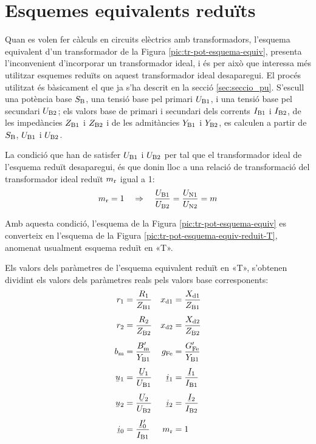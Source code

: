 \section{Esquemes equivalents reduïts}

Quan es volen fer càlculs en circuits elèctrics amb transformadors, l'esquema equivalent d'un transformador de la Figura  \vref{pic:tr-pot-esquema-equiv}, presenta l'inconvenient d'incorporar un transformador ideal, i és per això que interessa més utilitzar esquemes reduïts on aquest transformador ideal desaparegui.
El procés utilitzat és bàsicament el que ja s'ha descrit en la secció \vref{sec:seccio_pu}. S'escull una potència base $S_\mathrm{B}$, una tensió base pel primari $U_\mathrm{B1}$, i una tensió base pel secundari $U_\mathrm{B2}$; els valors base de primari i secundari dels corrents $I_\mathrm{B1}$ i $I_\mathrm{B2}$, de les impedàncies $Z_\mathrm{B1}$ i $Z_\mathrm{B2}$ i de les admitàncies $Y_\mathrm{B1}$ i $Y_\mathrm{B2}$, es calculen a partir de $S_\mathrm{B}$, $U_\mathrm{B1}$ i $U_\mathrm{B2}$.

La condició que han de satisfer $U_\mathrm{B1}$ i $U_\mathrm{B2}$ per tal que el transformador ideal de l'esquema reduït desaparegui, és que donin lloc a una relació de transformació del transformador ideal reduït $m_\mathrm{r}$ igual a  1:
\begin{equation}\label{eq:mr}
    m_\mathrm{r} = 1 \quad \Rightarrow \quad \frac{U_\mathrm{B1}}{U_\mathrm{B2}} = \frac{U_\mathrm{N1}}{U_\mathrm{N2}} = m
\end{equation}

 Amb aquesta condició, l'esquema de la Figura \vref{pic:tr-pot-esquema-equiv} es converteix en l'esquema de la Figura
\vref{pic:tr-pot-esquema-equiv-reduit-T}, anomenat usualment esquema reduït en «T».

\begin{center}
    
    \label{pic:tr-pot-esquema-equiv-reduit-T}
\end{center}

Els valors dels paràmetres de l'esquema equivalent reduït en «T», s'obtenen dividint els valors dels paràmetres reals pels valors base corresponents:
\begin{align}
    r\ped{1} &=\frac{R\ped{1}}{Z\ped{B1}} &   x\ped{d1} &=\frac{X\ped{d1}}{Z\ped{B1}} \\[1ex]
    r\ped{2} &=\frac{R\ped{2}}{Z\ped{B2}} &   x\ped{d2} &=\frac{X\ped{d2}}{Z\ped{B2}} \\[1ex]
    b\ped{m} &=\frac{B\ped{m}'}{Y\ped{B1}}  &   g\ped{Fe} &=\frac{G\ped{Fe}'}{Y\ped{B1}} \\[1ex]
    \cmplx{u}_1 &=\frac{\cmplx{U}_1}{U\ped{B1}} &   \cmplx{i}_1 &=\frac{\cmplx{I}_1}{I\ped{B1}} \\[1ex]
    \cmplx{u}_2 &=\frac{\cmplx{U}_2}{U\ped{B2}} &   \cmplx{i}_2 &=\frac{\cmplx{I}_2}{I\ped{B2}} \\[1ex]
    \cmplx{i}_0 &=\frac{\cmplx{I}_0'}{I\ped{B1}} &   m\ped{r} &=1
\end{align}


